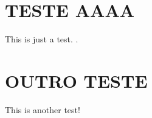 
    \section{\normalsize{\MakeUppercase{Teste aaaa}}}

    This is just a test. \cite{weber2010}.

    \newpage
    \section{\normalsize{\MakeUppercase{Outro teste}}}

    This is another test! \cite{weber2010internet}
